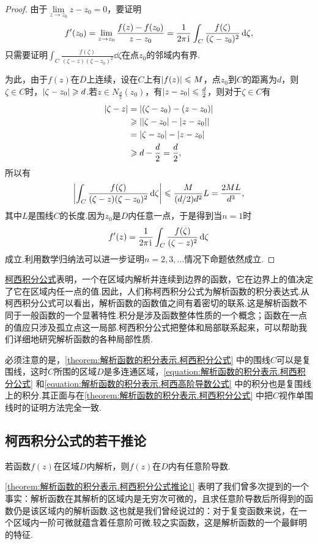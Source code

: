 \begin{theorem}
\begin{proof}
由于\(\lim\limits_{z \to z_0} z-z_0 = 0\)，要证明\[
f'(z_0) = \lim\limits_{z \to z_0} \frac{f(z)-f(z_0)}{z-z_0}
= \frac{1}{2\pi\kern1pt\mathrm{i}\kern1pt} \int_C{\frac{f(\zeta)}{(\zeta-z_0)^2}\dd{\zeta}},
\]只需要证明\(\int_C{\frac{f(\zeta)}{(\zeta-z)(\zeta-z_0)^2}\dd{\zeta}}\)在点\(z_0\)的邻域内有界.

为此，由于\(f(z)\)在\(\overline{D}\)上连续，设在\(C\)上有\(\abs{f(z)} \leqslant M\)，点\(z_0\)到\(C\)的距离为\(d\)，则\(\zeta \in C\)时，\(\abs{\zeta-z_0} \geqslant d\).若\(z \in N_{\frac{d}{2}}(z_0)\)，有\(\abs{z-z_0} \leqslant \frac{d}{2}\)，则对于\(\zeta \in C\)有\begin{align*}
\abs{\zeta-z}
&= \abs{(\zeta-z_0)-(z-z_0)} \\
&\geqslant \abs{ \abs{\zeta-z_0} - \abs{z-z_0} } \\
&= \abs{\zeta-z_0} - \abs{z-z_0} \\
&\geqslant d - \frac{d}{2} = \frac{d}{2},
\end{align*}
所以有\[
\abs{
 \int_C{\frac{f(\zeta)}{(\zeta-z)(\zeta-z_0)^2}\dd{\zeta}}
 } \leqslant \frac{M}{(d/2) d^2} L
= \frac{2ML}{d^3},
\]其中\(L\)是围线\(C\)的长度.因为\(z_0\)是\(D\)内任意一点，于是得到当\(n=1\)时\[
f'(z) = \frac{1}{2\pi\kern1pt\mathrm{i}\kern1pt} \int_C{\frac{f(\zeta)}{(\zeta-z)^2}\dd{\zeta}}
\]成立.利用数学归纳法可以进一步证明\(n=2,3,\dots\)情况下命题依然成立.
\end{proof}
\end{theorem}

\hyperref[equation:解析函数的积分表示.柯西积分公式]{柯西积分公式}表明，一个在区域内解析并连续到边界的函数，它在边界上的值决定了它在区域内任一点的值.因此，人们称柯西积分公式为解析函数的积分表达式.从柯西积分公式可以看出，解析函数的函数值之间有着密切的联系.这是解析函数不同于一般函数的一个显著特性.积分是涉及函数整体性质的一个概念；函数在一点的值应只涉及孤立点这一局部.柯西积分公式把整体和局部联系起来，可以帮助我们详细地研究解析函数的各种局部性质.

必须注意的是，\cref{theorem:解析函数的积分表示.柯西积分公式} 中的围线\(C\)可以是复围线，这时\(C\)所围的区域\(D\)是多连通区域，\cref{equation:解析函数的积分表示.柯西积分公式} 和\cref{equation:解析函数的积分表示.柯西高阶导数公式} 中的积分也是复围线上的积分.其正面与在\cref{theorem:解析函数的积分表示.柯西积分公式} 中把\(C\)视作单围线时的证明方法完全一致.

\subsection{柯西积分公式的若干推论}
\begin{corollary}\label{theorem:解析函数的积分表示.柯西积分公式推论1}
若函数\(f(z)\)在区域\(D\)内解析，则\(f(z)\)在\(D\)内有任意阶导数.
\end{corollary}
\cref{theorem:解析函数的积分表示.柯西积分公式推论1} 表明了我们曾多次提到的一个事实：解析函数在其解析的区域内是无穷次可微的，且求任意阶导数后所得到的函数仍是该区域内的解析函数.这也就是我们曾经说过的：对于复变函数来说，在一个区域内一阶可微就蕴含着任意阶可微.较之实函数，这是解析函数的一个最鲜明的特征.

